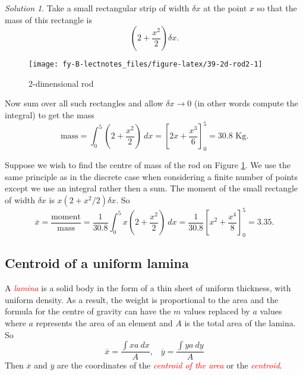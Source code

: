 \documentclass[
  11pt,
  oneside]{book}
\newcommand{\slide}{}
\theoremstyle{definition}
\theoremstyle{definition}
\theoremstyle{definition}
\theoremstyle{definition}
\theoremstyle{remark}
\newtheorem*{solution}{Solution}
\begin{document}
\begin{solution}
\leavevmode

Take a small rectangular strip of width \(\delta x\) at the point \(x\) so that the mass of this rectangle is
\[
\left(2+\frac{x^2}2\right)\delta x.
\]

\begin{figure}

{\centering \texttt{[image: fy-B-lectnotes\_files/figure-latex/39-2d-rod2-1]} 

}

\caption{2-dimensional rod}\label{fig:39-2d-rod2}
\end{figure}

Now sum over all such rectangles and allow \(\delta x \to 0\) (in other words compute the integral) to get the mass
\[
\text{mass} = \int_0^5\left(2+\frac{x^2}{2}\right)\ dx = \left[2x+\frac{x^3}{6}\right]_0^5 = 30.8\text{ Kg}.
\]

\end{solution}

\slide

Suppose we wish to find the centre of mass of the rod on Figure \ref{fig:39-2d-rod2}. We use the same principle as in the discrete case when considering a finite number of points except we use an integral rather then a sum. The moment of the small rectangle of width \(\delta x\) is \(x(2+x^2/2)\delta x\). So
\[
\overline x = \frac{\text{moment}}{\text{mass}} = \frac{1}{30.8}\int_0^5 x(2+\frac{x^2}{2})\ dx = \frac{1}{30.8}\left[x^2+\frac{x^4}{8}\right]_0^5 = 3.35.
\]
\slide

\subsection{Centroid of a uniform lamina}\label{centroid-of-a-uniform-lamina}

A \textcolor{red}{\em lamina} is a solid body in the form of a thin sheet of uniform thickness, with uniform density. As a result, the weight is proportional to the area and the formula for the centre of gravity can have the \(m\) values replaced by \(a\) values where \(a\) represents the area of an element and \(A\) is the total area of the lamina. So
\[
\overline x = \frac{\displaystyle\int xa\ dx}{A},\;\;\; \overline y = \frac{\displaystyle\int ya\ dy}{A}
\]
Then \(\overline x\) and \(\overline y\) are the coordinates of the \textcolor{red}{\em centroid of the area} or the \textcolor{red}{\em centroid}.
\end{document}
